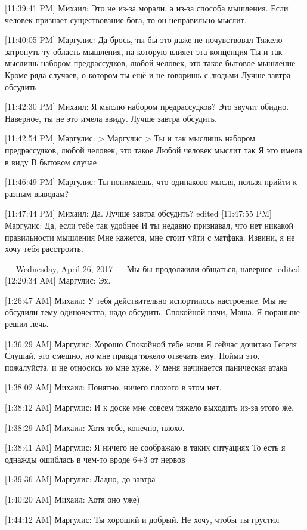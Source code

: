 \documentclass{article}
\begin{document}
[11:39:41 PM] Михаил:
Это не из-за морали, а из-за способа мышления. Если человек признает существование бога, то он неправильно мыслит.

[11:40:05 PM] Маргулис:
Да брось, ты бы это даже не почувствовал
 Тяжело затронуть ту область мышления, на которую влияет эта концепция
 Ты и так мыслишь набором предрассудков, любой человек, это такое бытовое мышление
 Кроме ряда случаев, о котором ты ещё и не говоришь с людьми
 Лучше завтра обсудить

[11:42:30 PM] Михаил:
Я мыслю набором предрассудков? Это звучит обидно. Наверное, ты не это имела ввиду. Лучше завтра обсудить.

[11:42:54 PM] Маргулис:
> Маргулис
> Ты и так мыслишь набором предрассудков, любой человек, это такое
Любой человек мыслит так
 Я это имела в виду
 В бытовом случае

[11:46:49 PM] Маргулис:
Ты понимаешь, что одинаково мысля, нельзя прийти к разным выводам?

[11:47:44 PM] Михаил:
Да. Лучше завтра обсудить?
edited 
[11:47:55 PM] Маргулис:
Да, если тебе так удобнее
 И ты недавно признавал, что нет никакой правильности мышления
 Мне кажется, мне стоит уйти с матфака. Извини, я не хочу тебя расстроить.

--- Wednesday, April 26, 2017 ---
 Мы бы продолжили общаться, наверное.
edited 
[12:20:34 AM] Маргулис:
Эх.

[1:26:47 AM] Михаил:
У тебя действительно испортилось настроение.
 Мы не обсудили тему одиночества, надо обсудить.
 Спокойной ночи, Маша. Я пораньше решил лечь.

[1:36:29 AM] Маргулис:
Хорошо
 Спокойной тебе ночи
 Я сейчас дочитаю Гегеля
 Слушай, это смешно, но мне правда тяжело отвечать ему. Пойми это, пожалуйста, и не относись ко мне хуже.
 У меня начинается паническая атака

[1:38:02 AM] Михаил:
Понятно, ничего плохого в этом нет.

[1:38:12 AM] Маргулис:
И к доске мне совсем тяжело выходить из-за этого же.

[1:38:29 AM] Михаил:
Хотя тебе, конечно, плохо.

[1:38:41 AM] Маргулис:
Я ничего не соображаю в таких ситуациях
 То есть я однажды ошиблась в чем-то вроде 6+3 от нервов

[1:39:36 AM] Маргулис:
Ладно, до завтра

[1:40:20 AM] Михаил:
Хотя оно уже)

[1:44:12 AM] Маргулис:
Ты хороший и добрый. Не хочу, чтобы ты грустил
\end{document}
